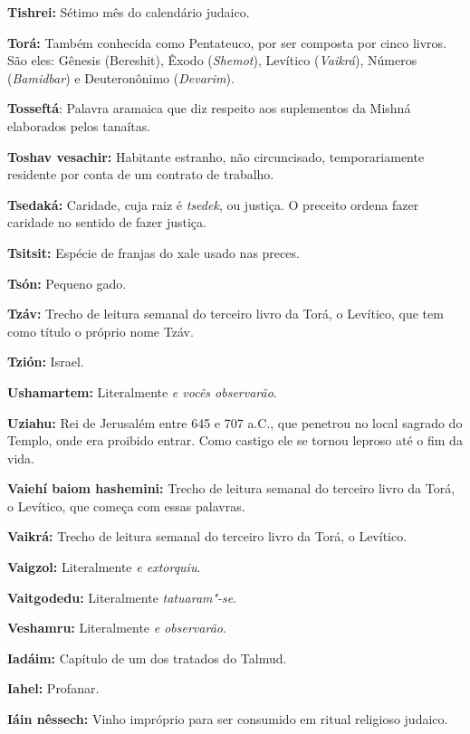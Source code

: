 \begin{hangparas}{.25in}{1}
{\textbf{Tishrei:} Sétimo mês do calendário judaico.

\textbf{Torá:} Também conhecida como Pentateuco, por ser composta por 
cinco livros. São eles: Gênesis (Bereshit), Êxodo (\emph{Shemot}), 
Levítico (\emph{Vaikrá}), Números (\emph{Bamidbar}) e Deuteronônimo (\emph{Devarim}).


\textbf{Tosseftá}: Palavra aramaica que diz respeito aos suplementos da Mishná
elaborados pelos tanaítas.

\textbf{Toshav vesachir:} Habitante estranho, não circuncisado, 
temporariamente residente por conta de um contrato de trabalho.

\textbf{Tsedaká:} Caridade, cuja raiz é \emph{tsedek}, ou justiça. O preceito ordena fazer caridade no sentido de fazer justiça.

\textbf{Tsitsit:} Espécie de franjas do xale usado nas preces.

\textbf{Tsón:} Pequeno gado.

\textbf{Tzáv:} Trecho de leitura semanal do terceiro livro da Torá, o
Levítico, que tem como título o próprio nome Tzáv.

\textbf{Tzión:} Israel.

\textbf{Ushamartem:} Literalmente \emph{e vocês observarão}.

\textbf{Uziahu:} Rei de Jerusalém entre 645 e 707 a.C., que penetrou no local
sagrado do Templo, onde era proibido entrar. Como castigo ele se tornou
leproso até o fim da vida.

\textbf{Vaiehí baiom hashemini:} Trecho de leitura semanal do terceiro livro da Torá, 
o Levítico, que começa com essas palavras.

\textbf{Vaikrá:} Trecho de leitura semanal do terceiro livro da Torá, o Levítico.

\textbf{Vaigzol:} Literalmente \emph{e extorquiu}.

\textbf{Vaitgodedu:} Literalmente \emph{tatuaram"-se}.

\textbf{Veshamru:} Literalmente \emph{e observarão}.

\textbf{Iadáim:} Capítulo de um dos tratados do Talmud.

\textbf{Iahel:} Profanar.

\textbf{Iáin nêssech:} Vinho impróprio para ser consumido em ritual religioso judaico.

}
\end{hangparas}
